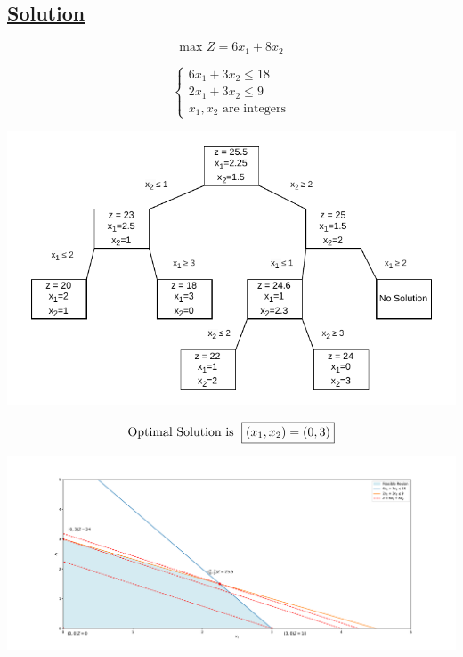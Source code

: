 \vspace{1cm}
\subsection*{\underline{Solution}}
\[ \text{max } Z = 6x_1 + 8x_2\]  

\[    
\left\{
    \begin{array}{l}
        6x_{1} + 3x_{2} \leq 18 \\[2pt]
        2x_{1} + 3x_{2} \leq 9 \\[2pt]
        x_{1}, x_{2} \text{ are integers}
    \end{array}
    \right.
\]

\begin{center}
    \includegraphics{Exercice/PY/EX1/b1.drawio.pdf}
\end{center}

\vspace{0.5cm}

\[\text{Optimal Solution is }\hspace{0.1cm} \boxed{(x_1,x_2) = (0,3)}\]

\begin{center}
    \includegraphics[width = \textwidth]{Exercice/PY/EX1/ex1.1.pdf}
\end{center}


